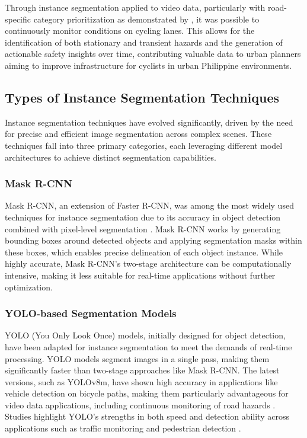 Through instance segmentation applied to video data, particularly with road-specific category prioritization as demonstrated by \citet{Wang2022}, it was possible to continuously monitor conditions on cycling lanes. This allows for the identification of both stationary and transient hazards and the generation of actionable safety insights over time, contributing valuable data to urban planners aiming to improve infrastructure for cyclists in urban Philippine environments.
\subsection{Types of Instance Segmentation Techniques}
Instance segmentation techniques have evolved significantly, driven by the need for precise and efficient image segmentation across complex scenes. These techniques fall into three primary categories, each leveraging different model architectures to achieve distinct segmentation capabilities.

\subsubsection{Mask R-CNN}
Mask R-CNN, an extension of Faster R-CNN, was among the most widely used techniques for instance segmentation due to its accuracy in object detection combined with pixel-level segmentation \citep{He:2017}. Mask R-CNN works by generating bounding boxes around detected objects and applying segmentation masks within these boxes, which enables precise delineation of each object instance. While highly accurate, Mask R-CNN's two-stage architecture can be computationally intensive, making it less suitable for real-time applications without further optimization.

\subsubsection{YOLO-based Segmentation Models}
YOLO (You Only Look Once) models, initially designed for object detection, have been adapted for instance segmentation to meet the demands of real-time processing. YOLO models segment images in a single pass, making them significantly faster than two-stage approaches like Mask R-CNN. The latest versions, such as YOLOv8m, have shown high accuracy in applications like vehicle detection on bicycle paths, making them particularly advantageous for video data applications, including continuous monitoring of road hazards \citep{GarciaPajuelo2024}. Studies highlight YOLO's strengths in both speed and detection ability across applications such as traffic monitoring and pedestrian detection \citep{Sumit2020}.

